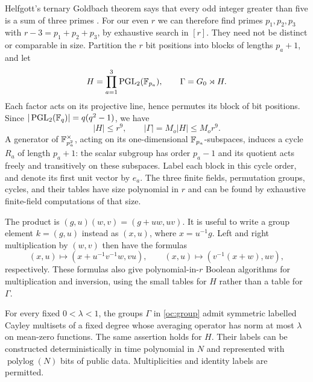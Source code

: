 Helfgott's ternary Goldbach theorem says that every odd integer greater
than five is a sum of three primes \cite[Main Theorem]{Helfgott2013}.
For our even $r$ we can therefore find primes
$p_1,p_2,p_3$ with $r-3=p_1+p_2+p_3$, by exhaustive search in $[r]$.
They need not be distinct or comparable in size.  Partition the $r$ bit
positions into blocks of lengths $p_a+1$, and let
\begin{equation}\label{oc:group}
 H=\prod_{a=1}^3\operatorname{PGL}_2(\mathbb{F}_{p_a}),
 \qquad \Gamma=G_0\rtimes H.
\end{equation}
Each factor acts on its projective line, hence permutes its block of bit
positions.  Since
$|\operatorname{PGL}_2(\mathbb{F}_q)|=q(q^2-1)$, we have
\begin{equation}\label{oc:group-order}
 |H|\le r^9,\qquad |\Gamma|=M_o|H|\le M_or^9.
\end{equation}
A generator of $\mathbb{F}_{p_a^2}^{\times}$, acting on its one-dimensional
$\mathbb{F}_{p_a}$-subspaces, induces a cycle $R_a$ of length $p_a+1$:
the scalar subgroup has order $p_a-1$ and its quotient acts freely and
transitively on these subspaces.  Label each block in this cycle order,
and denote its first unit vector by $e_a$.  The three finite fields,
permutation groups, cycles, and their tables have size polynomial in $r$
and can be found by exhaustive finite-field computations of that size.

The product is $(g,u)(w,v)=(g+uw,uv)$.  It is useful to write a group
element $k=(g,u)$ instead as $(x,u)$, where $x=u^{-1}g$.
Left and right multiplication by $(w,v)$ then have the formulas
\begin{equation}\label{oc:actions}
 (x,u)\longmapsto (x+u^{-1}v^{-1}w,vu),
 \qquad
 (x,u)\longmapsto (v^{-1}(x+w),uv),
\end{equation}
respectively.  These formulas also give polynomial-in-$r$ Boolean
algorithms for multiplication and inversion, using the small tables for
$H$ rather than a table for $\Gamma$.

\begin{lemma}\label{oc:expansion}
For every fixed $0<\lambda<1$, the groups $\Gamma$ in
\eqref{oc:group} admit symmetric labelled Cayley multisets of a fixed
degree whose averaging operator has norm at most $\lambda$ on mean-zero
functions.  The same assertion holds for $H$.  Their labels can be
constructed deterministically in time polynomial in $N$ and represented
with $\operatorname{polylog}(N)$ bits of public data.  Multiplicities and identity
labels are permitted.
\end{lemma}

